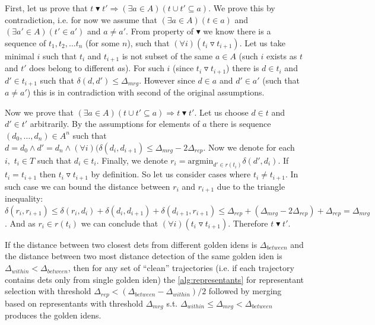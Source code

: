 \begin{myproof}
First, let us prove that $t \blacktriangledown t' \Rightarrow (\exists a \in A) (t \cup t' \subseteq a)$. We prove this by contradiction, i.e. for now we assume
that $(\exists a \in A) (t \in a)$ and $(\exists a' \in A) (t' \in a')$ and $a \neq a'$. From property of $\blacktriangledown$ we know there is a sequence of $t_1, t_2, \ldots t_n$ (for some $n$), such that $(\forall i) (t_i \triangledown t_{i+1})$. Let
us take minimal $i$ such that $t_i$ and $t_{i+1}$ is not subset of the same
$a \in A$ (such $i$ exists as $t$ and $t'$ does belong to different $a$s).
For such $i$ (since $t_i \triangledown t_{i+1}$) there is $d \in t_i$ and
$d' \in t_{i+1}$ such that $\delta(d, d') \leq \Delta_{mrg}$. However since $d \in a$
and $d' \in a'$ (such that $a \neq a'$) this is in contradiction with second
of the original assumptions.

Now we prove that $(\exists a \in A) (t \cup t' \subseteq a) \Rightarrow t \blacktriangledown t'$. Let us choose $d \in t$ and $d' \in t'$ arbitrarily. By the
assumptions for elements of $a$ there is sequence $(d_0, \ldots, d_n) \in A^n$
such that $d = d_0 \land d' = d_n \land (\forall i) (\delta(d_i, d_{i+1}) \leq \Delta_{mrg} - 2\Delta_{rep}$. Now we denote for each $i,$ $t_i \in T$ such that
$d_i \in t_i$. Finally, we denote $r_i = \mathrm{argmin}_{d' \in r(t_i)} \delta(d', d_i)$. If $t_i = t_{i+1}$ then $t_i \triangledown t_{i+1}$ by definition.
So let us consider cases where $t_i \neq t_{i+1}$. In such case we can bound
the distance between $r_i$ and $r_{i+1}$ due to the triangle inequality:
$\delta(r_i, r_{i+1}) \leq \delta(r_i, d_i) + \delta(d_i, d_{i+1}) + \delta(d_{i+1}, r_{i+1}) \leq \Delta_{rep} + (\Delta_{mrg} - 2\Delta_{rep}) + \Delta_{rep} = \Delta_{mrg}$. And as $r_i \in r(t_i)$ we can conclude that $(\forall i) (t_i \triangledown t_{i+1})$. Therefore $t \blacktriangledown t'$.\end{myproof}


\begin{cor}
If the distance between two closest \glspl{det} from different golden
\glspl{iden} is $\Delta_{between}$ and the distance between two most distance detection
of the same golden \gls{iden} is $\Delta_{within} < \Delta_{between}$, then for any set of ``clean''
trajectories (i.e. if each trajectory contains \glspl{det} only from single
golden \gls{iden}) the \autoref{alg:representants} for representant selection
with threshold $\Delta_{rep} < (\Delta_{between} - \Delta_{within}) / 2$ followed by merging based on representants with
threshold $\Delta_{mrg}$ s.t. $\Delta_{within} \leq \Delta_{mrg} < \Delta_{between}$ produces the golden \glspl{iden}.
\end{cor}

